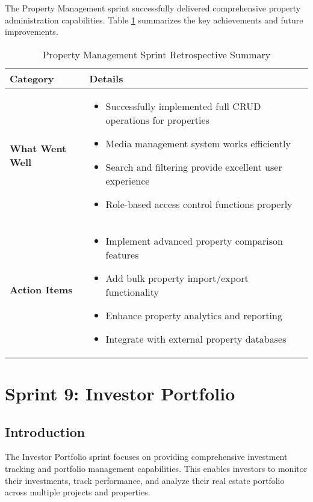 The Property Management sprint successfully delivered comprehensive property administration capabilities. Table \ref{tab:property-management-retrospective} summarizes the key achievements and future improvements.

\begin{table}[htbp]
    \centering
    \begin{tabular}{|p{3cm}|p{10cm}|}
        \hline
        \textbf{Category} & \textbf{Details} \\
        \hline
        \textbf{What Went Well} & 
        \begin{itemize}
            \item Successfully implemented full CRUD operations for properties
            \item Media management system works efficiently
            \item Search and filtering provide excellent user experience
            \item Role-based access control functions properly
        \end{itemize} \\
        \hline
        \textbf{Action Items} & 
        \begin{itemize}
            \item Implement advanced property comparison features
            \item Add bulk property import/export functionality
            \item Enhance property analytics and reporting
            \item Integrate with external property databases
        \end{itemize} \\
        \hline
    \end{tabular}
    \caption{Property Management Sprint Retrospective Summary}
    \label{tab:property-management-retrospective}
\end{table}

\newpage

\section{Sprint 9: Investor Portfolio}

\subsection{Introduction}
The Investor Portfolio sprint focuses on providing comprehensive investment tracking and portfolio management capabilities. This enables investors to monitor their investments, track performance, and analyze their real estate portfolio across multiple projects and properties.

